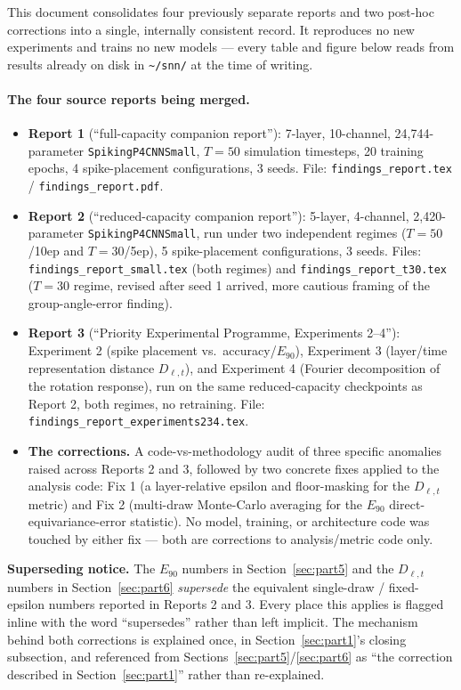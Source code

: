 \documentclass[11pt]{article}
\begin{document}
This document consolidates four previously separate reports and two post-hoc corrections into a
single, internally consistent record. It reproduces no new experiments and trains no new models ---
every table and figure below reads from results already on disk in \texttt{\textasciitilde/snn/} at the
time of writing.

\paragraph{The four source reports being merged.}
\begin{itemize}[leftmargin=1.6em]
\item \textbf{Report 1} (``full-capacity companion report''): 7-layer, 10-channel, 24{,}744-parameter
\texttt{SpikingP4CNNSmall}, $T=50$ simulation timesteps, 20 training epochs, 4 spike-placement
configurations, 3 seeds. File: \texttt{findings\_report.tex} / \texttt{findings\_report.pdf}.
\item \textbf{Report 2} (``reduced-capacity companion report''): 5-layer, 4-channel, 2{,}420-parameter
\texttt{SpikingP4CNNSmall}, run under two independent regimes ($T{=}50$/10ep and $T{=}30$/5ep), 5
spike-placement configurations, 3 seeds. Files: \texttt{findings\_report\_small.tex} (both regimes) and
\texttt{findings\_report\_t30.tex} ($T{=}30$ regime, revised after seed 1 arrived, more cautious framing
of the group-angle-error finding).
\item \textbf{Report 3} (``Priority Experimental Programme, Experiments 2--4''): Experiment 2 (spike
placement vs.\ accuracy/$E_{90}$), Experiment 3 (layer/time representation distance $D_{\ell,t}$), and
Experiment 4 (Fourier decomposition of the rotation response), run on the same reduced-capacity
checkpoints as Report 2, both regimes, no retraining. File: \texttt{findings\_report\_experiments234.tex}.
\item \textbf{The corrections.} A code-vs-methodology audit of three specific anomalies raised across
Reports 2 and 3, followed by two concrete fixes applied to the analysis code: Fix 1 (a layer-relative
epsilon and floor-masking for the $D_{\ell,t}$ metric) and Fix 2 (multi-draw Monte-Carlo averaging for
the $E_{90}$ direct-equivariance-error statistic). No model, training, or architecture code was touched
by either fix --- both are corrections to analysis/metric code only.
\end{itemize}

\begin{supersede}
\textbf{Superseding notice.} The $E_{90}$ numbers in Section~\ref{sec:part5} and the $D_{\ell,t}$
numbers in Section~\ref{sec:part6} \emph{supersede} the equivalent single-draw / fixed-epsilon numbers
reported in Reports 2 and 3. Every place this applies is flagged inline with the word ``supersedes''
rather than left implicit. The mechanism behind both corrections is explained once, in
Section~\ref{sec:part1}'s closing subsection, and referenced from Sections~\ref{sec:part5}/\ref{sec:part6}
as ``the correction described in Section~\ref{sec:part1}'' rather than re-explained.
\end{supersede}
\end{document}
